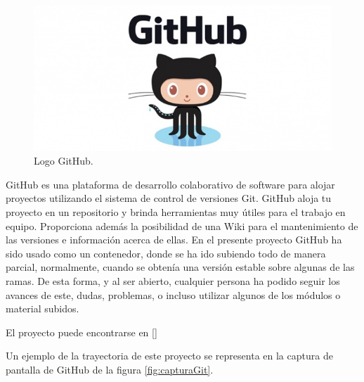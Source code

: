 \begin{figure}[H]
	\center
	\includegraphics[trim = 0mm 0mm 0mm 0mm, clip,scale=0.4]{imagenes/Introduction/github}
	\caption{Logo GitHub.}
	\label{fig:github}
\end{figure}


GitHub es una plataforma de desarrollo colaborativo de software para alojar proyectos utilizando el sistema de control de versiones Git. GitHub aloja tu proyecto en un repositorio y brinda herramientas muy útiles para el trabajo en equipo. \newline
Proporciona además la posibilidad de una Wiki para el mantenimiento de las versiones e información acerca de ellas. \newline
En el presente proyecto GitHub ha sido usado como un contenedor, donde se ha ido subiendo todo de manera parcial, normalmente, cuando se obtenía una versión estable sobre algunas de las ramas. \newline
De esta forma, y al ser abierto, cualquier persona ha podido seguir los avances de este, dudas, problemas, o incluso utilizar algunos de los módulos o material subidos. \newline
 
El proyecto puede encontrarse en [] \newline  

Un ejemplo de la trayectoria de este proyecto se representa en la captura de pantalla de GitHub de la figura \ref{fig:capturaGit}.

